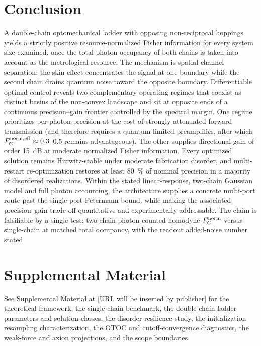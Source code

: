 \documentclass[aps,prxquantum,preprint,superscriptaddress,amsmath,amssymb]{revtex4-2}
\newcommand{\Fnorm}{F_C^{\rm norm}}
\newcommand{\Fnormeff}{F_C^{\rm norm,eff}}
\begin{document}
\section{Conclusion}
\label{sec:conclusion}

A double-chain optomechanical ladder with opposing non-reciprocal hoppings yields a strictly positive resource-normalized Fisher information for every system size examined, once the total photon occupancy of both chains is taken into account as the metrological resource. The mechanism is spatial channel separation: the skin effect concentrates the signal at one boundary while the second chain drains quantum noise toward the opposite boundary. Differentiable optimal control reveals two complementary operating regimes that coexist as distinct basins of the non-convex landscape and sit at opposite ends of a continuous precision--gain frontier controlled by the spectral margin. One regime prioritizes per-photon precision at the cost of strongly attenuated forward transmission (and therefore requires a quantum-limited preamplifier, after which $\Fnormeff\approx\num{0.3}$--$\num{0.5}$ remains advantageous). The other supplies directional gain of order \qty{15}{\dB} at moderate normalized Fisher information. Every optimized solution remains Hurwitz-stable under moderate fabrication disorder, and multi-restart re-optimization restores at least \qty{80}{\percent} of nominal precision in a majority of disordered realizations. Within the stated linear-response, two-chain Gaussian model and full photon accounting, the architecture supplies a concrete multi-port route past the single-port Petermann bound, while making the associated precision--gain trade-off quantitative and experimentally addressable. The claim is falsifiable by a single test: two-chain photon-counted homodyne $\Fnorm$ versus single-chain at matched total occupancy, with the readout added-noise number stated.

\section*{Supplemental Material}

See Supplemental Material at [URL will be inserted by publisher] for the theoretical framework, the single-chain benchmark, the double-chain ladder parameters and solution classes, the disorder-resilience study, the initialization-resampling characterization, the OTOC and cutoff-convergence diagnostics, the weak-force and axion projections, and the scope boundaries.
\end{document}
